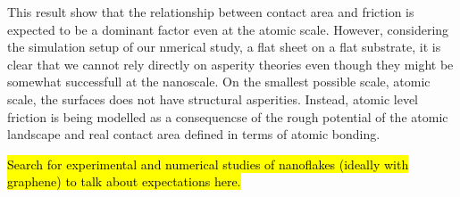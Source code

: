 This result show that the relationship between contact area and friction is expected to be a dominant factor even at the atomic scale. However, considering the simulation setup of our nmerical study, a flat sheet on a flat substrate, it is clear that we cannot rely directly on asperity theories even though they might be somewhat successfull at the nanoscale. On the smallest possible scale, atomic scale, the surfaces does not have structural asperities. Instead, atomic level friction is being modelled as a consequencse of the rough potential of the atomic landscape and real contact area defined in terms of atomic bonding. 


\hl{Search for experimental and numerical studies of nanoflakes (ideally with graphene) to talk about expectations here.} 
















